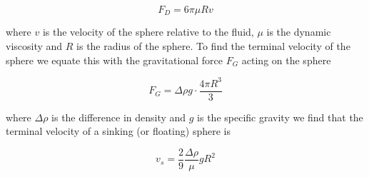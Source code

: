 \begin{equation}
F_D = 6\pi \mu R v
\end{equation}

where $v$ is the velocity of the sphere relative to the fluid, $\mu$ is the dynamic viscosity and $R$ is the radius of the sphere. To find the terminal velocity of the sphere we equate this with the gravitational force $F_G$ acting on the sphere

\begin{equation}
F_G = \Delta \rho g\cdot \frac{4\pi R^3}{3}
\end{equation}

where $\Delta \rho$ is the difference in density and $g$ is the specific gravity we find that the terminal velocity of a sinking (or floating) sphere is

\begin{equation}\label{eq:fallingSphere}
v_s = \frac{2}{9} \frac{\Delta \rho}{\mu} g R^2
\end{equation}



%

